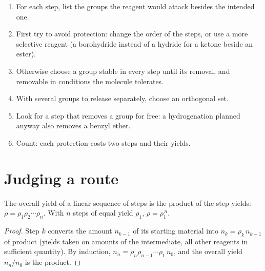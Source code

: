 \begin{method}\label{met:b2:retrosynthesis:protect-in-route}
\begin{enumerate}
  \item For each step, list the groups the reagent would attack besides the intended one.
  \item First try to avoid protection: change the order of the steps, or use a more selective reagent
        (a borohydride instead of a hydride for a ketone beside an ester).
  \item Otherwise choose a group stable in every step until its removal, and removable in conditions the
        molecule tolerates.
  \item With several groups to release separately, choose an orthogonal set.
  \item Look for a step that removes a group for free: a hydrogenation planned anyway also removes a
        benzyl ether.
  \item Count: each protection costs two steps and their yields.
\end{enumerate}
\end{method}

\section{Judging a route}\label{sec:b2:retrosynthesis:judging}

\begin{proposition}\label{prop:b2:retrosynthesis:overall-yield}
The overall yield of a linear sequence of steps is the product of the step yields:
$\rho = \rho_1 \rho_2 \cdots \rho_n$. With $n$ steps of equal yield $\rho_1$, $\rho = \rho_1^{\,n}$.
\end{proposition}

\begin{proof}
Step $k$ converts the amount $n_{k-1}$ of its starting material into $n_k = \rho_k\, n_{k-1}$ of product
(yields taken on amounts of the intermediate, all other reagents in sufficient quantity). By induction,
$n_n = \rho_n \rho_{n-1} \cdots \rho_1\, n_0$, and the overall yield $n_n/n_0$ is the product.
\end{proof}

